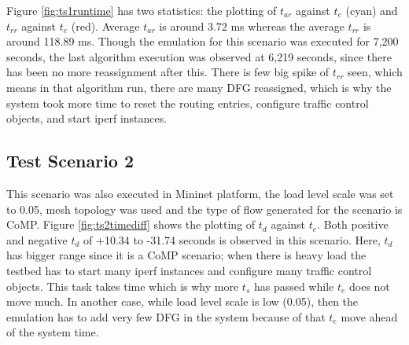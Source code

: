 \begin{figure}[H]
	\begin{center}
	\end{center}
\end{figure}

Figure \ref{fig:ts1runtime} has two statistics: the plotting of $t_{ar}$ against $t_e$ (cyan) and $t_{rr}$ against $t_e$ (red). Average $t_{ar}$ is around 3.72 ms whereas the average $t_{rr}$ is around 118.89 ms. Though the emulation for this scenario was executed for 7,200 seconds, the last algorithm execution was observed at 6,219 seconds, since there has been no more reassignment after this. There is few big spike of $t_{rr}$ seen, which means in that algorithm run, there are many DFG reassigned, which is why the system took more time to reset the routing entries, configure traffic control objects, and start iperf instances.

\subsection{Test Scenario 2}
This scenario was also executed in Mininet platform, the load level scale was set to 0.05, mesh topology was used and the type of flow generated for the scenario is CoMP. Figure \ref{fig:ts2timediff} shows the plotting of $t_d$ against $t_e$. Both positive and negative $t_d$ of +10.34 to -31.74 seconds is observed in this scenario. Here, $t_d$ has bigger range since it is a CoMP scenario; when there is heavy load the testbed has to start many iperf instances and configure many traffic control objects. This task takes time which is why more $t_s$ has passed while $t_e$ does not move much. In another case, while load level scale is low (0.05), then the emulation has to add very few DFG in the system because of that $t_e$ move ahead of the system time.

\begin{figure}[H]
	\begin{center}
	\end{center}
\end{figure}


